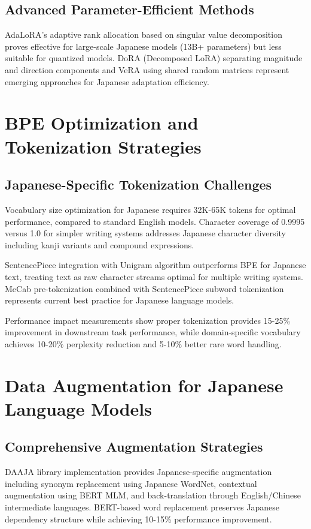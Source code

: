 \documentclass[11pt,a4paper]{article}
\begin{document}
\subsection{Advanced Parameter-Efficient Methods}

AdaLoRA's adaptive rank allocation based on singular value decomposition proves effective for large-scale Japanese models (13B+ parameters) but less suitable for quantized models. DoRA (Decomposed LoRA) separating magnitude and direction components and VeRA using shared random matrices represent emerging approaches for Japanese adaptation efficiency.

\section{BPE Optimization and Tokenization Strategies}

\subsection{Japanese-Specific Tokenization Challenges}

Vocabulary size optimization for Japanese requires 32K-65K tokens for optimal performance, compared to standard English models. Character coverage of 0.9995 versus 1.0 for simpler writing systems addresses Japanese character diversity including kanji variants and compound expressions.

SentencePiece integration with Unigram algorithm outperforms BPE for Japanese text, treating text as raw character streams optimal for multiple writing systems. MeCab pre-tokenization combined with SentencePiece subword tokenization represents current best practice for Japanese language models.

Performance impact measurements show proper tokenization provides 15-25\% improvement in downstream task performance, while domain-specific vocabulary achieves 10-20\% perplexity reduction and 5-10\% better rare word handling.

\section{Data Augmentation for Japanese Language Models}

\subsection{Comprehensive Augmentation Strategies}

DAAJA library implementation provides Japanese-specific augmentation including synonym replacement using Japanese WordNet, contextual augmentation using BERT MLM, and back-translation through English/Chinese intermediate languages. BERT-based word replacement preserves Japanese dependency structure while achieving 10-15\% performance improvement.
\end{document}
